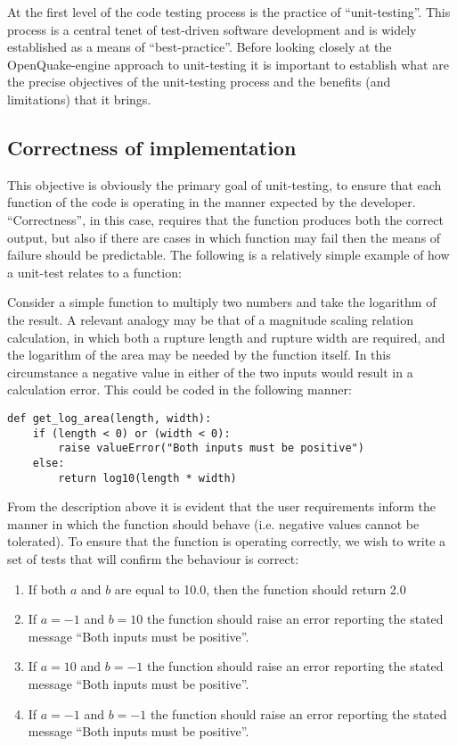At the first level of the code testing process is the practice of
``unit-testing''. This process is a central tenet of test-driven software
development and is widely established as a means of ``best-practice''. %
Before looking closely at the OpenQuake-engine approach to unit-testing it is important to establish what are the precise objectives of the unit-testing process and the benefits (and limitations) that it brings.


\subsection{Correctness of implementation}
This objective is obviously the primary goal of unit-testing, to ensure that each function of the code is operating in the manner expected by the developer. ``Correctness'', in this case, requires that the function produces both the correct output, but also if there are cases in which function may fail then the means of failure should be predictable. The following is a relatively simple example of how a unit-test relates to a function:

Consider a simple function to multiply two numbers and take the logarithm of the result. A relevant analogy may be that of a magnitude scaling relation calculation, in which both a rupture length and rupture width are required, and the logarithm of the area may be needed by the function itself. In this circumstance a negative value in either of the two inputs would result in a calculation error. This could be coded in the following manner:

\begin{lstlisting}[frame=single]
def get_log_area(length, width):
    if (length < 0) or (width < 0):
        raise valueError("Both inputs must be positive")
    else:
        return log10(length * width)
\end{lstlisting}

From the description above it is evident that the user requirements  inform the manner in which the function should behave (i.e. negative
values cannot be tolerated). To ensure that the function is operating
correctly, we wish to write a set of tests that will confirm the behaviour is correct:

\begin{enumerate}
\item If both $a$ and $b$ are equal to 10.0, then the function     should return 2.0
\item If $a = -1$ and $b = 10$ the function should raise an error     reporting the stated message ``Both inputs must be positive''.
\item If $a = 10$ and $b = -1$ the function should raise an error     reporting the stated message ``Both inputs must be positive''.
\item If $a = -1$ and $b = -1$ the function should raise an error     reporting the stated message ``Both inputs must be positive''.
\end{enumerate}

